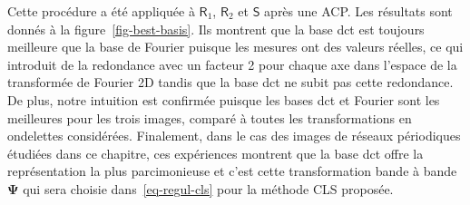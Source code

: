 Cette procédure a été appliquée à $\mathsf{R}_1$, $\mathsf{R}_2$ et $\mathsf{S}$ après une ACP. Les résultats sont donnés à la figure~\ref{fig-best-basis}. Ils montrent que la base \gls{dct} est toujours meilleure que la base de Fourier puisque les mesures ont des valeurs réelles, ce qui introduit de la redondance avec un facteur 2 pour chaque axe dans l'espace de la transformée de Fourier 2D tandis que la base \gls{dct} ne subit pas cette redondance. De plus, notre intuition est confirmée puisque les bases \gls{dct} et Fourier sont les meilleures pour les trois images, comparé à toutes les transformations en ondelettes considérées. Finalement, dans le cas des images de réseaux périodiques étudiées dans ce chapitre, ces expériences montrent que la base \gls{dct} offre la représentation la plus parcimonieuse et c'est cette transformation bande à bande $\boldsymbol\Psi$ qui sera choisie dans~\eqref{eq-regul-cls} pour la méthode CLS proposée.

